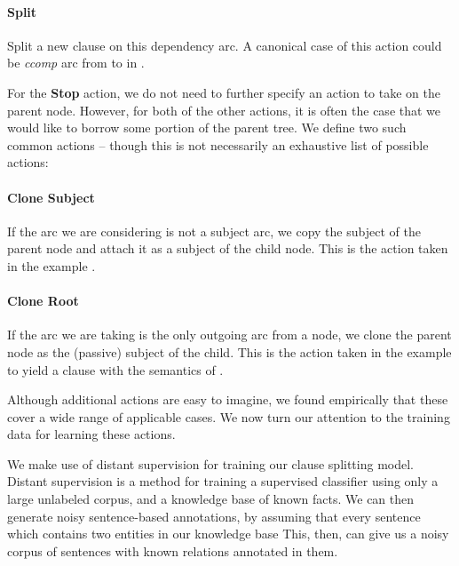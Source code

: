 \paragraph{Split}
  Split a new clause on this dependency arc.
  A canonical case of this action could be \textit{ccomp} arc from 
    to  in .

For the \textbf{Stop} action, we do not need to further specify an action
  to take on the parent node.
However, for both of the other actions, it is often the case that we would like
  to borrow some portion of the parent tree.
We define two such common actions -- though this is not necessarily an
  exhaustive list of possible actions:

\paragraph{Clone Subject} 
  If the arc we are considering is not a subject arc,
    we copy the subject of the parent node and attach it as a subject of the
    child node.
  This is the action taken in the example
    .

\paragraph{Clone Root} 
  If the arc we are taking is the only outgoing arc from a node, we clone the
    parent node as the (passive) subject of the child.
  This is the action taken in the example
     to yield a clause with the
    semantics of .

Although additional actions are easy to imagine, we found empirically that
  these cover a wide range of applicable cases.
We now turn our attention to the training data for learning these actions.

%
%

We make use of distant supervision for training our clause splitting model.
Distant supervision is a method for training a supervised classifier using only
  a large unlabeled corpus, and a knowledge base of known facts.
We can then generate noisy sentence-based annotations, by assuming that every
  sentence which contains two entities in our knowledge base 
This, then, can give us a noisy corpus of sentences with known relations 
  annotated in them.

